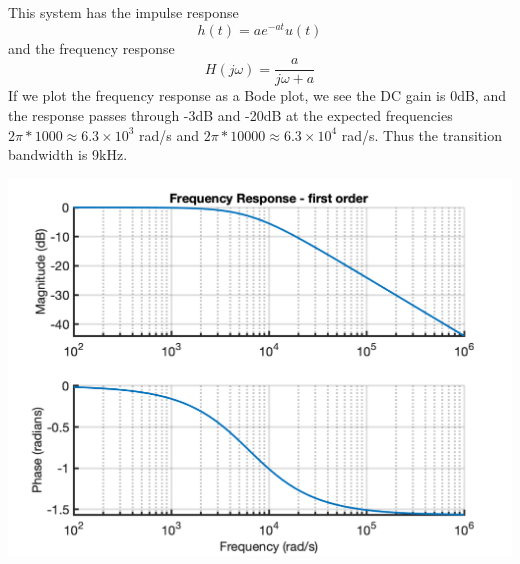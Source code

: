 \begin{example}
\begin{center}
  \end{center}
  
  This system has the impulse response
  \[
  h(t) = ae^{-at}u(t)
  \]
  and the frequency response
  \[
  H(j\omega) = \frac{a}{j\omega + a}
  \]
  If we plot the frequency response as a Bode plot, we see the DC gain is 0dB, and the response passes through -3dB and -20dB at the expected frequencies $2\pi*1000 \approx 6.3\times 10^3$ rad/s and $2\pi*10000 \approx 6.3\times 10^4$ rad/s. Thus the transition bandwidth is 9kHz. 
  \begin{center}
\includegraphics[scale=0.7]{graphics/lecture24_1.png}
  \end{center}
  
\end{example}

